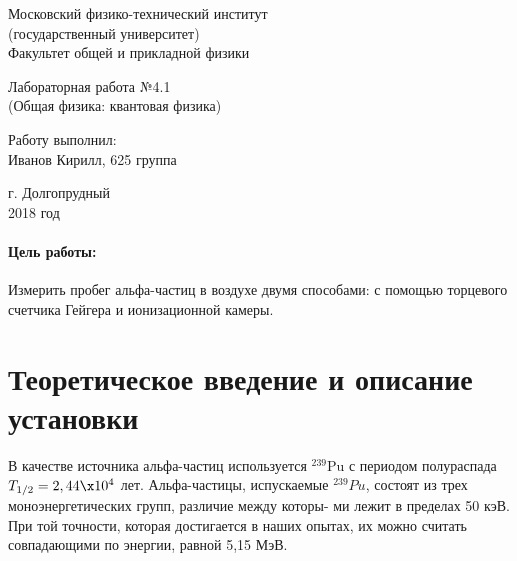 \documentclass[12pt]{kiarticle}
\begin{document}
	
	\begin{titlepage}
		\begin{center}
			\large 	Московский физико-технический институт \\
			(государственный университет) \\
			Факультет общей и прикладной физики \\
			\vspace{0.2cm}
			
			\vspace{4.5cm}
			Лабораторная работа №4.1  \\ \vspace{0.2cm}
			\large (Общая физика: квантовая физика) \\ \vspace{0.2cm}
			\LARGE \textbf{   }
		\end{center}
		\vspace{2.3cm} \large
		
		\begin{center}
			Работу выполнил: \\
			Иванов Кирилл,
			625 группа
			\vspace{10mm}		
			
		\end{center}
		
		\begin{center} \vspace{60mm}
			г. Долгопрудный \\
			2018 год
		\end{center}
	\end{titlepage}


	\paragraph*{Цель работы:} Измерить пробег альфа-частиц в воздухе двумя способами: с помощью торцевого счетчика Гейгера и ионизационной камеры. 
	
	
	\section{Теоретическое введение и описание установки}
	
	В качестве источника альфа-частиц используется $ ^{239}  $Pu  с периодом полураспада $ T_{1/2} = 2,44 \x 10^4 $ лет. Альфа-частицы, испускаемые $ ^{239} Pu $, состоят из трех моноэнергетических групп, различие между которы-
	ми лежит в пределах 50 кэВ. При той точности, которая достигается
	в наших опытах, их можно считать совпадающими по энергии, равной
	5,15 МэВ.
	
\end{document}
